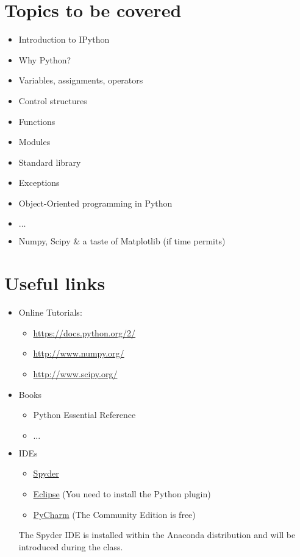 \documentclass[11pt]{article}
\begin{document}
\section{Topics to be covered}
\begin{itemize} 
 \item Introduction to IPython
 \item Why Python?
 \item Variables, assignments, operators
 \item Control structures
 \item Functions
 \item Modules
 \item Standard library 
 \item Exceptions
 \item Object-Oriented programming in Python
 \item $\ldots$
 \item Numpy, Scipy \& a taste of Matplotlib (if time permits)
\end{itemize}

\section{Useful links}
\begin{itemize} 
 \item Online Tutorials:
    \begin{itemize} 
       \item \url{https://docs.python.org/2/} 
       \item \url{http://www.numpy.org/}
       \item \url{http://www.scipy.org/}
    \end{itemize} 
 \item Books
    \begin{itemize} 
       \item Python Essential Reference\,\cite{BEAZLEY:2009a}
       \item $\ldots$
    \end{itemize} 
 \item IDEs
    \begin{itemize}
       \item \href{http://code.google.com/p/spyderlib/}{Spyder}
       \item \href{http://www.eclipse.org/}{Eclipse} (You need to install the Python plugin)
       \item \href{http://www.jetbrains.com/pycharm/}{PyCharm} (The Community Edition is free) 
    \end{itemize}
    The Spyder IDE is installed within the Anaconda distribution and will be introduced during the class.
\end{itemize}



\end{document}
